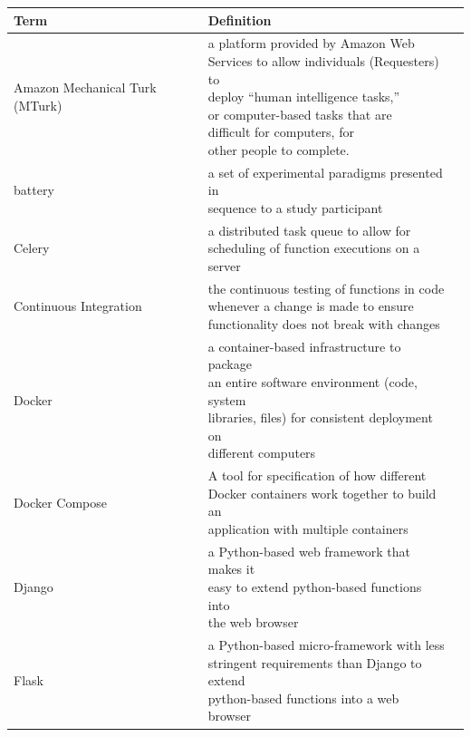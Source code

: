 \documentclass{report}
\begin{document}
\begin{table}[ht!]
\centering
\begin{tabular}{ | l | l |p{5cm} |}
    \hline
    \textbf{Term} & \textbf{Definition} \\ \hline
    Amazon Mechanical Turk (MTurk) & \shortstack[l]{a platform provided by Amazon Web \\ Services to allow individuals (Requesters) to \\ deploy ``human intelligence tasks,'' \\ or computer-based tasks that are \\ difficult for computers, for \\other people to complete.} \\ \hline
    battery & \shortstack[l]{a set of experimental paradigms presented in \\ sequence to a study participant } \\ \hline
    Celery & \shortstack[l]{a distributed task queue to allow for \\ scheduling of function executions on a server} \\ \hline
    Continuous Integration & \shortstack[l]{the continuous testing of functions in code \\ whenever a change is made to ensure \\functionality does not break with changes} \\ \hline
    Docker & \shortstack[l]{a container-based infrastructure to package \\an entire software environment (code, system \\libraries, files) for consistent deployment on \\different computers} \\ \hline
    Docker Compose & \shortstack[l]{A tool for specification of how different\\ Docker containers work together to build an \\application with multiple containers} \\ \hline
    Django & \shortstack[l]{a Python-based web framework that makes it\\ easy to extend python-based functions into\\ the web browser } \\ \hline
    Flask & \shortstack[l]{a Python-based micro-framework with less \\stringent requirements than Django to extend \\python-based functions into a web browser} \\ \hline

\end{tabular}
\end{table}
\end{document}
